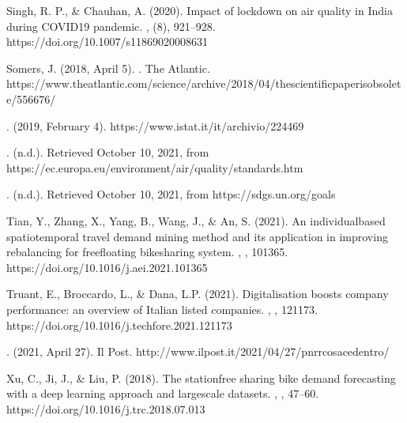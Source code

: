 \documentclass[letterpaper,10pt,english]{jupyterBook}
\begin{document}
\sphinxAtStartPar
Singh, R. P., \& Chauhan, A. (2020). Impact of lockdown on air quality in India during COVID\sphinxhyphen{}19 pandemic. , (8), 921–928. https://doi.org/10.1007/s11869\sphinxhyphen{}020\sphinxhyphen{}00863\sphinxhyphen{}1

\sphinxAtStartPar
Somers, J. (2018, April 5). . The Atlantic. https://www.theatlantic.com/science/archive/2018/04/the\sphinxhyphen{}scientific\sphinxhyphen{}paper\sphinxhyphen{}is\sphinxhyphen{}obsolete/556676/

\sphinxAtStartPar
{}. (2019, February 4). https://www.istat.it/it/archivio/224469

\sphinxAtStartPar
{}. (n.d.). Retrieved October 10, 2021, from https://ec.europa.eu/environment/air/quality/standards.htm

\sphinxAtStartPar
{}. (n.d.). Retrieved October 10, 2021, from https://sdgs.un.org/goals

\sphinxAtStartPar
Tian, Y., Zhang, X., Yang, B., Wang, J., \& An, S. (2021). An individual\sphinxhyphen{}based spatio\sphinxhyphen{}temporal travel demand mining method and its application in improving rebalancing for free\sphinxhyphen{}floating bike\sphinxhyphen{}sharing system. , , 101365. https://doi.org/10.1016/j.aei.2021.101365

\sphinxAtStartPar
Truant, E., Broccardo, L., \& Dana, L.\sphinxhyphen{}P. (2021). Digitalisation boosts company performance: an overview of Italian listed companies. , , 121173. https://doi.org/10.1016/j.techfore.2021.121173

\sphinxAtStartPar
{}. (2021, April 27). Il Post. http://www.ilpost.it/2021/04/27/pnrr\sphinxhyphen{}cosa\sphinxhyphen{}ce\sphinxhyphen{}dentro/

\sphinxAtStartPar
Xu, C., Ji, J., \& Liu, P. (2018). The station\sphinxhyphen{}free sharing bike demand forecasting with a deep learning approach and large\sphinxhyphen{}scale datasets. , , 47–60. https://doi.org/10.1016/j.trc.2018.07.013
\end{document}
